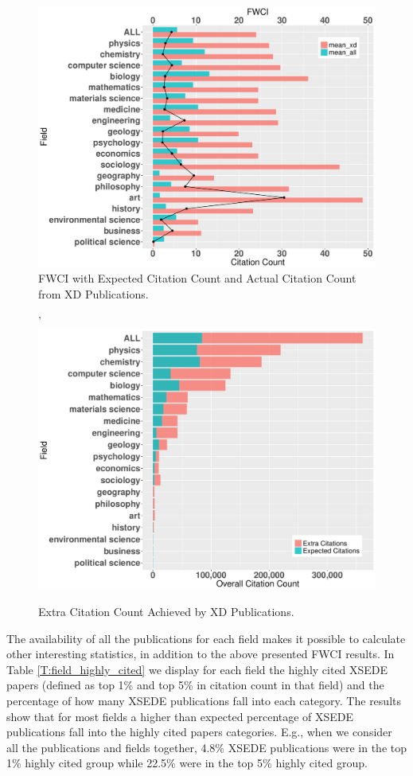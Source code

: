 \documentclass[sigconf]{acmart}
\begin{document}
\begin{figure}[htb!]
  \centering
    \includegraphics[width=0.95\columnwidth]{images/FWCIwCC.pdf}
    \caption{FWCI with Expected Citation Count and Actual Citation Count from XD Publications.}
    \label{F:FWCIwCC}
\end{figure}

\begin{figure}[htb!]'
  \centering
    \includegraphics[width=0.95\columnwidth]{images/FWCI_CC.pdf}
    \caption{Extra Citation Count Achieved by XD Publications.}
    \label{F:FWCI_CC}
\end{figure}

The availability of all the publications for each field makes it
possible to calculate other interesting statistics, in addition to the
above presented FWCI results. In Table \ref{T:field_highly_cited} we
display for each field the highly cited XSEDE papers (defined as top
1\% and top 5\% in citation count in that field) and the percentage of
how many XSEDE publications fall into each category. The results show
that for most fields a higher than expected percentage of XSEDE
publications fall into the highly cited papers categories. E.g., when
we consider all the publications and fields together, 4.8\% XSEDE
publications were in the top 1\% highly cited group while 22.5\% were
in the top 5\% highly cited group.
\end{document}
